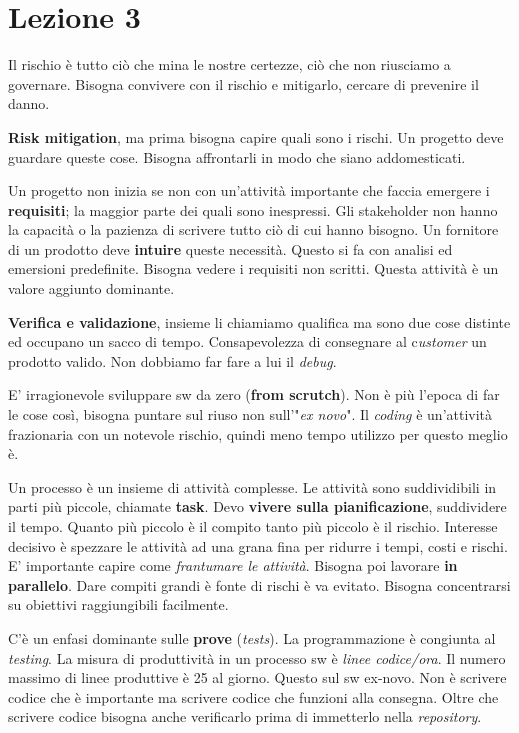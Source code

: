 



\section{Lezione 3}

Il rischio è tutto ciò che mina le nostre certezze, ciò che non riusciamo a governare. Bisogna convivere con il rischio e mitigarlo, cercare di prevenire il danno.

\textbf{Risk mitigation}, ma prima bisogna capire quali sono i rischi. Un progetto deve guardare queste cose. Bisogna affrontarli in modo che siano addomesticati.

Un progetto non inizia se non con un'attività importante che faccia emergere i \textbf{requisiti}; la maggior parte dei quali sono inespressi. Gli stakeholder non hanno la capacità o la pazienza di scrivere tutto ciò di cui hanno bisogno. Un fornitore di un prodotto deve \textbf{intuire} queste necessità. Questo si fa con analisi ed emersioni predefinite. Bisogna vedere i requisiti non scritti. Questa attività è un valore aggiunto dominante.

\textbf{Verifica e validazione}, insieme li chiamiamo qualifica ma sono due cose distinte ed occupano un sacco di tempo. Consapevolezza di consegnare al c\textit{ustomer} un prodotto valido. Non dobbiamo far fare a lui il \textit{debug}.

E' irragionevole sviluppare sw da zero (\textbf{from scrutch}). Non è più l'epoca di far le cose così, bisogna puntare sul riuso non sull'"\textit{ex novo}". Il \textit{coding} è un'attività frazionaria con un notevole rischio, quindi meno tempo utilizzo per questo meglio è.

Un processo è un insieme di attività complesse. Le attività sono suddividibili in parti più piccole, chiamate \textbf{task}. Devo \textbf{vivere sulla pianificazione}, suddividere il tempo. Quanto più piccolo è il compito tanto più piccolo è il rischio. Interesse decisivo è spezzare le attività ad una grana fina per ridurre i tempi, costi e rischi. E' importante capire come \textit{frantumare le attività}. Bisogna poi lavorare \textbf{in parallelo}. Dare compiti grandi è fonte di rischi è va evitato. Bisogna concentrarsi su obiettivi raggiungibili facilmente.

C'è un enfasi dominante sulle \textbf{prove} (\textit{tests}). La programmazione è congiunta al \textit{testing}. La misura di produttività in un processo sw è \textit{linee codice/ora}. Il numero massimo di linee produttive è 25 al giorno. Questo sul sw ex-novo. Non è scrivere codice che è importante ma scrivere codice che funzioni alla consegna. Oltre che scrivere codice bisogna anche verificarlo prima di immetterlo nella \textit{repository}.

